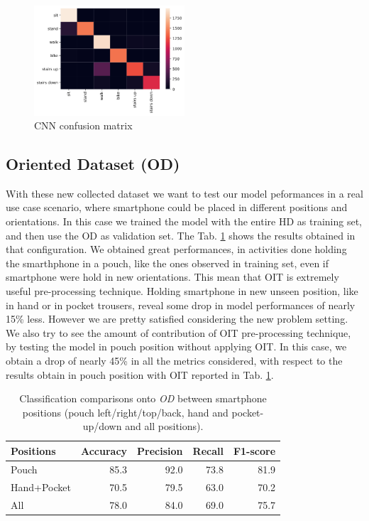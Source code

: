 \begin{figure}[h]
	\centering
	\includegraphics[width=0.5\textwidth]{images/confusion_matrix.png}
	\caption{CNN confusion matrix}
	\label{fig:cnn-confusion-matrix}
\end{figure}


\subsection{Oriented Dataset (OD)}

With these new collected dataset we want to test our model peformances in a real use case scenario, where smartphone could be placed in different positions and orientations. In this case we trained the model with the entire HD as training set, and then use the OD as validation set. The Tab. \ref{tab:model-oit-performance} shows the results obtained in that configuration. We obtained great performances, in activities done holding the smarthphone in a pouch, like the ones observed in training set, even if smartphone were hold in new orientations. This mean that OIT is extremely useful pre-processing technique.
Holding smartphone in new unseen position, like in hand or in pocket trousers, reveal some drop in model performances of nearly 15\% less. However we are pretty satisfied considering the new problem setting.   
We also try to see the amount of contribution of OIT pre-processing technique, by testing the model in pouch position without applying OIT. In this case, we obtain a drop of nearly 45\% in all the metrics considered, with respect to the results obtain in pouch position with OIT reported in Tab. \ref{tab:model-oit-performance}.

\begin{table}[ht]
  \begin{center}
    \begin{tabular}{p{1.8cm}rrrr}
      \hline
      Positions & Accuracy & Precision & Recall & F1-score \\
      \hline
      Pouch & 85.3 & 92.0 & 73.8 & 81.9 \\
      Hand+Pocket & 70.5 & 79.5 & 63.0 & 70.2 \\
      All & 78.0 & 84.0 & 69.0 & 75.7 \\
      \hline
    \end{tabular}
    \caption{Classification comparisons onto \textit{OD} between
      smartphone positions (pouch left/right/top/back, hand and
      pocket-up/down and all positions).}
    \label{tab:model-oit-performance}
  \end{center}
\end{table}


